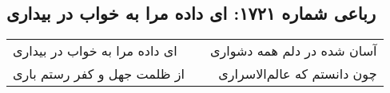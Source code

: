 \begin{center}
\section*{رباعی شماره ۱۷۲۱: ای داده مرا به خواب در بیداری}
\label{sec:1721}
\begin{longtable}{l p{0.5cm} r}
ای داده مرا به خواب در بیداری
&&
آسان شده در دلم همه دشواری
\\
از ظلمت جهل و کفر رستم باری
&&
چون دانستم که عالم‌الاسراری
\\
\end{longtable}
\end{center}
